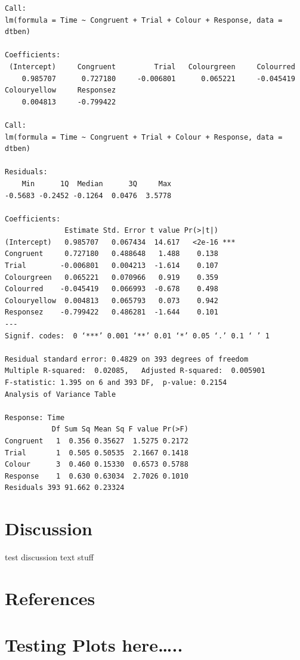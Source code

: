 \documentclass{article}
\begin{document}
\begin{verbatim}
Call:
lm(formula = Time ~ Congruent + Trial + Colour + Response, data = dtben)

Coefficients:
 (Intercept)     Congruent         Trial   Colourgreen     Colourred  
    0.985707      0.727180     -0.006801      0.065221     -0.045419  
Colouryellow     Responsez  
    0.004813     -0.799422

Call:
lm(formula = Time ~ Congruent + Trial + Colour + Response, data = dtben)

Residuals:
    Min      1Q  Median      3Q     Max 
-0.5683 -0.2452 -0.1264  0.0476  3.5778 

Coefficients:
              Estimate Std. Error t value Pr(>|t|)    
(Intercept)   0.985707   0.067434  14.617   <2e-16 ***
Congruent     0.727180   0.488648   1.488    0.138    
Trial        -0.006801   0.004213  -1.614    0.107    
Colourgreen   0.065221   0.070966   0.919    0.359    
Colourred    -0.045419   0.066993  -0.678    0.498    
Colouryellow  0.004813   0.065793   0.073    0.942    
Responsez    -0.799422   0.486281  -1.644    0.101    
---
Signif. codes:  0 ‘***’ 0.001 ‘**’ 0.01 ‘*’ 0.05 ‘.’ 0.1 ‘ ’ 1

Residual standard error: 0.4829 on 393 degrees of freedom
Multiple R-squared:  0.02085,	Adjusted R-squared:  0.005901 
F-statistic: 1.395 on 6 and 393 DF,  p-value: 0.2154
Analysis of Variance Table

Response: Time
           Df Sum Sq Mean Sq F value Pr(>F)
Congruent   1  0.356 0.35627  1.5275 0.2172
Trial       1  0.505 0.50535  2.1667 0.1418
Colour      3  0.460 0.15330  0.6573 0.5788
Response    1  0.630 0.63034  2.7026 0.1010
Residuals 393 91.662 0.23324
\end{verbatim}


\section{Discussion}
\label{sec:org83b8ebe}
test discussion text stuff

\section{References}
\label{sec:orga034912}



\section{Testing Plots here\ldots{}..}
\label{sec:orgff8f20b}
\end{document}
